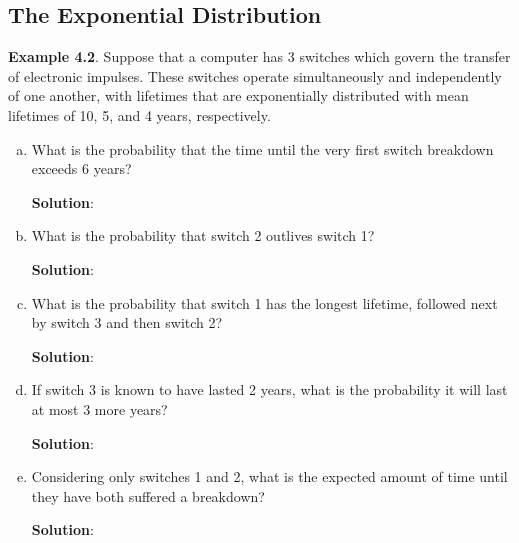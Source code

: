 \subsection*{The Exponential Distribution}
\begin{Example}
    \textbf{Example 4.2}. Suppose that a computer has 3 switches which govern the transfer of electronic
    impulses. These switches operate simultaneously and independently of one another, with
    lifetimes that are exponentially distributed with mean lifetimes of 10, 5, and 4 years,
    respectively.
    \begin{enumerate}[(a)]
        \item What is the probability that the time until the very first switch breakdown exceeds 6
              years?

              \textbf{Solution}:
        \item What is the probability that switch 2 outlives switch 1?

              \textbf{Solution}:
        \item What is the probability that switch 1 has the longest lifetime, followed next by switch 3
              and then switch 2?

              \textbf{Solution}:
        \item If switch 3 is known to have lasted 2 years, what is the probability it will last at most 3
              more years?

              \textbf{Solution}:
        \item Considering only switches 1 and 2, what is the expected amount of time until they have
              both suffered a breakdown?

              \textbf{Solution}:
    \end{enumerate}
\end{Example}
